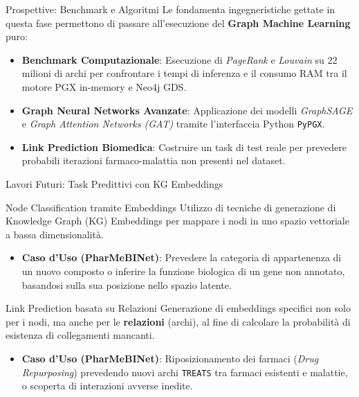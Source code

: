 \documentclass[aspectratio=169]{beamer}
\begin{document}
\begin{frame}{Prospettive: Benchmark e Algoritmi}
    \small
    Le fondamenta ingegneristiche gettate in questa fase permettono di passare all'esecuzione del \textbf{Graph Machine Learning} puro:
    
    \vspace{0.3cm}
    \begin{itemize}
        \item[\faChartLine] \textbf{Benchmark Computazionale}: Esecuzione di \textit{PageRank} e \textit{Louvain} su 22 milioni di archi per confrontare i tempi di inferenza e il consumo RAM tra il motore PGX in-memory e Neo4j GDS.
        \item[\faProjectDiagram] \textbf{Graph Neural Networks Avanzate}: Applicazione dei modelli \textit{GraphSAGE} e \textit{Graph Attention Networks (GAT)} tramite l'interfaccia Python \texttt{PyPGX}.
        \item[\faDna] \textbf{Link Prediction Biomedica}: Costruire un task di test reale per prevedere probabili iterazioni farmaco-malattia non presenti nel dataset.
    \end{itemize}
\end{frame}

\begin{frame}{Lavori Futuri: Task Predittivi con KG Embeddings}
  \begin{block}{\faTags \hspace{0.2cm} Node Classification tramite Embeddings}
    \small
    Utilizzo di tecniche di generazione di Knowledge Graph (KG) Embeddings per mappare i nodi in uno spazio vettoriale a bassa dimensionalità.
    \begin{itemize}
      \item \textbf{Caso d'Uso (PharMeBINet)}: Prevedere la categoria di appartenenza di un nuovo composto o inferire la funzione biologica di un gene non annotato, basandosi sulla sua posizione nello spazio latente.
    \end{itemize}
  \end{block}

  \vspace{0.1cm}
  \begin{exampleblock}{\faLink \hspace{0.2cm} Link Prediction basata su Relazioni}
    \small
    Generazione di embeddings specifici non solo per i nodi, ma anche per le \textbf{relazioni} (archi), al fine di calcolare la probabilità di esistenza di collegamenti mancanti.
    \begin{itemize}
      \item \textbf{Caso d'Uso (PharMeBINet)}: Riposizionamento dei farmaci (\textit{Drug Repurposing}) prevedendo nuovi archi \texttt{TREATS} tra farmaci esistenti e malattie, o scoperta di interazioni avverse inedite.
    \end{itemize}
  \end{exampleblock}
\end{frame}
\end{document}
